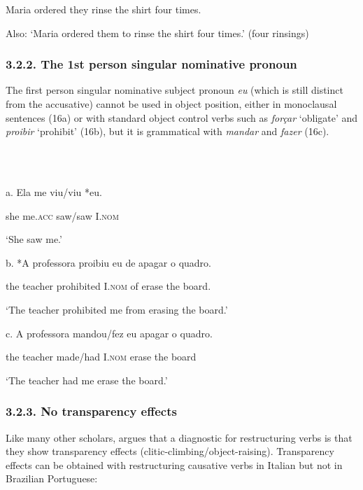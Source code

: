 \documentclass[output=paper]{langsci/langscibook}
\begin{document}
    Maria ordered they   rinse     the shirt  four times.

 Also: ‘Maria ordered them to rinse the shirt four times.’ (four rinsings)

\subsubsection{ 3.2.2. The 1st person singular nominative pronoun}

The first person singular nominative subject pronoun \textit{eu} (which is still distinct from the accusative) cannot be used in object position, either in monoclausal sentences (16a) or with standard object control verbs such as \textit{forçar} ‘obligate’ and \textit{proibir} ‘prohibit’ (16b), but it is grammatical with \textit{mandar} and \textit{fazer} (16c). 

\ea%
    \label{ex:moreno:16}
    \gll\\
        \\
    \glt
    \z

          a.  Ela  me     viu/viu  *eu.

             she   me.\textsc{acc} saw/saw     I.\textsc{nom}

    ‘She saw me.’

  b.  *A professora proibiu   eu        de apagar o quadro.

    the teacher     prohibited   I.\textsc{nom}  of erase    the board. 

    ‘The teacher prohibited me from erasing the board.’

  c.  A professora mandou/fez  eu        apagar o quadro.

    the teacher    made/had      I.\textsc{nom} erase    the board

    ‘The teacher had me erase the board.’ \citep[121]{Farrell1995}

\subsubsection{ 3.2.3. No transparency effects}

Like many other scholars, \citet{Cinque2004} argues that a diagnostic for restructuring verbs is that they show transparency effects (clitic-climbing/object-raising). Transparency effects can be obtained with restructuring causative verbs in Italian but not in Brazilian Portuguese:

\ea%
    \label{ex:moreno:17}
    \gll\\
        \\
    \glt
    \z
\end{document}
